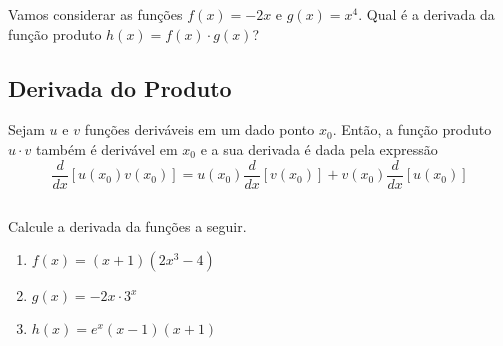\begin{frame}
  \begin{example}
    Vamos considerar as funções $f(x) = -2x$ e $g(x) = x^4$. Qual é a derivada da função produto $h(x) = f(x)\cdot g(x)$?
  \end{example}
\end{frame}

\subsection{Derivada do Produto}
\begin{frame}
  \begin{theorem}
    Sejam $u$ e $v$ funções deriváveis em um dado ponto $x_{0}$. Então, a função produto $u\cdot v$ também é derivável em $x_{0}$ e a sua derivada é dada pela expressão
    \begin{equation*}
      \frac{d}{dx}\left[u(x_{0}) v(x_{0})\right]=u(x_{0}) \frac{d}{dx}\left[v(x_{0})\right]+v(x_{0}) \frac{d}{dx}\left[u(x_{0})\right]
    \end{equation*}
  \end{theorem}
  \begin{columns}[onlytextwidth]
    \begin{column}{0.5\textwidth}
      \begin{example-highlight}
        Calcule a derivada da funções a seguir.
        \begin{enumerate}
          \item $f(x)=(x+1)(2x^3-4)$
          \item $g(x) = -2x\cdot 3^{x}$
          \item $h(x) = e^{x}(x-1)(x+1)$
        \end{enumerate}
      \end{example-highlight}
    \end{column}
    \begin{column}{0.5\textwidth}
    \end{column}
  \end{columns}
  \vspace*{-0.2cm}
\end{frame}

